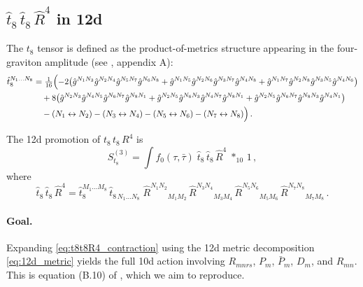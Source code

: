 \subsection{$\hat t_8\,\hat t_8\,\hat R^4$ in 12d}

The $t_8$ tensor is defined as the product-of-metrics structure appearing
in the four-graviton amplitude (see \cite{Minasian:2015bxa}, appendix A):
\begin{equation}\label{eq:t8_def}
\begin{aligned}
    \hat t_8^{N_1\dots N_8}
    &= \tfrac{1}{16}\Bigl(
        -2\bigl(\hat g^{N_1N_3}\hat g^{N_2N_4}\hat g^{N_5N_7}\hat g^{N_6N_8}
        + \hat g^{N_1N_5}\hat g^{N_2N_6}\hat g^{N_3N_7}\hat g^{N_4N_8}
        + \hat g^{N_1N_7}\hat g^{N_2N_8}\hat g^{N_3N_5}\hat g^{N_4N_6}\bigr)\\
    &\quad +8\bigl(\hat g^{N_2N_3}\hat g^{N_4N_5}\hat g^{N_6N_7}\hat g^{N_8N_1}
        + \hat g^{N_2N_5}\hat g^{N_6N_3}\hat g^{N_4N_7}\hat g^{N_8N_1}
        + \hat g^{N_2N_5}\hat g^{N_6N_7}\hat g^{N_8N_3}\hat g^{N_4N_1}\bigr)\\
    &\quad -(N_1\leftrightarrow N_2) - (N_3\leftrightarrow N_4)
           - (N_5\leftrightarrow N_6) - (N_7\leftrightarrow N_8)
    \Bigr)\,.
\end{aligned}
\end{equation}

The 12d promotion of $t_8\,t_8\,R^4$ is
\begin{equation}\label{eq:t8t8R4_12d}
    S_{t_8}^{(3)}
    = \int f_0(\tau,\bar\tau)\;\hat t_8\,\hat t_8\,\hat R^4\;{*_{10}}\,1\,,
\end{equation}
where
\begin{equation}\label{eq:t8t8R4_contraction}
    \hat t_8\,\hat t_8\,\hat R^4
    = \hat t_8^{M_1\dots M_8}\,\hat t_{8\,N_1\dots N_8}\;
      \hat R^{N_1N_2}{}_{M_1M_2}\,
      \hat R^{N_3N_4}{}_{M_3M_4}\,
      \hat R^{N_5N_6}{}_{M_5M_6}\,
      \hat R^{N_7N_8}{}_{M_7M_8}\,.
\end{equation}

\paragraph{Goal.}
Expanding \eqref{eq:t8t8R4_contraction} using the 12d metric
decomposition \eqref{eq:12d_metric} yields the full 10d action
involving $R_{mnrs}$, $P_m$, $\bar P_m$, $D_m$, and $R_{mn}$.
This is equation (B.10) of \cite{Minasian:2015bxa}, which we aim to reproduce.
